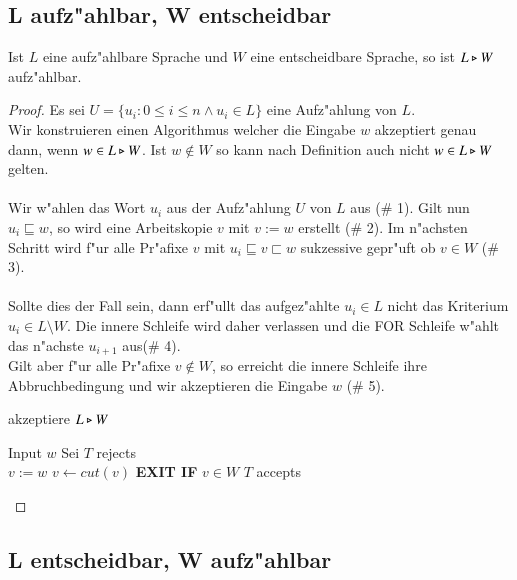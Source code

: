 \subsection{L aufz"ahlbar, W entscheidbar}
\begin{satz}
Ist $L$ eine aufz"ahlbare Sprache und $W$ eine entscheidbare Sprache, so ist $L\triangleright W$ aufz"ahlbar.
\end{satz}
\begin{proof}
Es sei $U=\{u_i : 0 \le i \le n \wedge u_i \in L\}$ eine Aufz"ahlung von $L$.\\
Wir konstruieren einen Algorithmus welcher die Eingabe $w$ akzeptiert genau dann, wenn $w\in L\triangleright W$.
Ist $w\notin W$ so kann nach Definition auch nicht $w\in L\triangleright W$ gelten. \\\\Wir w"ahlen das Wort $u_i$ aus der Aufz"ahlung $U$ von $L$ aus (\# 1).
Gilt nun $u_i\sqsubseteq w$, so wird eine Arbeitskopie $v$ mit $v:=w$ erstellt (\# 2). Im n"achsten Schritt wird f"ur alle Pr"afixe $v$ mit $u_i\sqsubseteq v\sqsubset w$ sukzessive gepr"uft ob $v\in W$ (\# 3). 
\\\\Sollte dies der Fall sein, dann erf"ullt das aufgez"ahlte $u_i\in L$ nicht das Kriterium $u_i\in L\setminus W$. Die innere Schleife wird daher verlassen und die FOR Schleife w"ahlt das n"achste $u_{i+1}$ aus(\# 4).%
\\Gilt aber f"ur alle Pr"afixe $v\notin W$, so erreicht die innere Schleife ihre Abbruchbedingung und wir akzeptieren die Eingabe $w$ (\# 5).


\begin{algorithm}
\caption{akzeptiere $L\triangleright W$}
\label{split2}
\begin{algorithmic}
\STATE Input $w$
\STATE Sei
\STATE $T$ rejects
\ENDIF\\
\STATE $v := w$ 
\STATE $v \leftarrow cut(v)$ 
\STATE \textbf{EXIT IF} $v\in W$ 
\ENDWHILE
{}
\STATE $T$ accepts 
\ENDIF
\ENDIF
\ENDFOR

\end{algorithmic}
\end{algorithm}
\end{proof}
\newpage
\subsection{L entscheidbar, W aufz"ahlbar}

